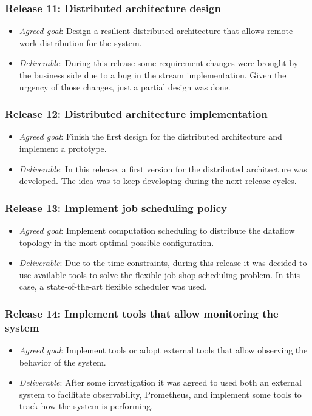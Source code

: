 \subsubsection{Release 11: Distributed architecture design}
\begin{itemize}
\item \textit{Agreed goal}: Design a resilient distributed architecture that
  allows remote work distribution for the system.
\item \textit{Deliverable}: During this release some requirement changes were brought
  by the business side due to a bug in the stream implementation. Given the urgency
  of those changes, just a partial design was done.
\end{itemize}

\subsubsection{Release 12: Distributed architecture implementation}
\begin{itemize}
\item \textit{Agreed goal}: Finish the first design for the distributed
  architecture and implement a prototype.
\item \textit{Deliverable}: In this release, a first version for the distributed
  architecture was developed. The idea was to keep developing during the next
  release cycles.
\end{itemize}

\subsubsection{Release 13: Implement job scheduling policy}
\begin{itemize}
\item \textit{Agreed goal}: Implement computation scheduling to distribute the
  dataflow topology in the most optimal possible configuration.
\item \textit{Deliverable}: Due to the time constraints, during this release it
  was decided to use available tools to solve the flexible job-shop scheduling
  problem. In this case, a state-of-the-art flexible scheduler was used\cite{firmament}.
\end{itemize}

\subsubsection{Release 14: Implement tools that allow monitoring the system}
\begin{itemize}
\item \textit{Agreed goal}: Implement tools or adopt external tools that allow
  observing the behavior of the system.
\item \textit{Deliverable}: After some investigation it was agreed to used both
  an external system to facilitate observability, Prometheus, and implement some
  tools to track how the system is performing.
\end{itemize}

